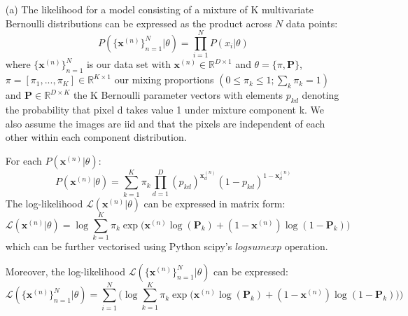 \documentclass[12pt]{article}
\begin{document}
\begin{enumerate}

%
%

\item[(a)] The likelihood for a model consisting of a mixture of K multivariate Bernoulli distributions can be expressed as the product across $N$ data points:
$$P(\{\textbf{x}^{(n)}\}_{n=1}^{N}|\theta) = \prod_{i=1}^{N}P(x_i|\theta)$$
where $\{\textbf{x}^{(n)}\}_{n=1}^{N}$ is our data set with $\textbf{x}^{(n)} \in \mathbb{R}^{D \times 1}$ and $\theta = \{\pi, \mathbf{P}\}$, $\pi = [\pi_1, . . . , \pi_K] \in \mathbb{R}^{K \times 1}$ our mixing proportions $(0 \leq \pi_k \leq 1; \sum_k \pi_k = 1)$ and $\mathbf{P} \in \mathbb{R}^{D \times K}$ the K Bernoulli parameter vectors with elements $p_{kd}$ denoting the probability that pixel d takes value 1 under mixture component k. We also assume the images are iid and that the pixels are independent of each other within each component distribution.

For each $P(\textbf{x}^{(n)}|\theta)$:
$$P(\textbf{x}^{(n)}|\theta) = \sum_{k=1}^{K} \pi_k \prod_{d=1}^D (p_{kd})^{\textbf{x}^{(n)}_{d}} (1-p_{kd})^{1-\textbf{x}^{(n)}_{d}}$$
The log-likelihood $\mathcal{L}(\textbf{x}^{(n)}|\theta)$ can be expressed in matrix form:
$$\mathcal{L}(\textbf{x}^{(n)}|\theta) = \log \sum_{k=1}^{K}  \pi_k \exp\bigg(\textbf{x}^{(n)}\log(\mathbf{P}_{k}) + (1-\textbf{x}^{(n)})\log(1-\mathbf{P}_{k})\bigg) $$
which can be further vectorised using Python scipy's $logsumexp$ operation.

Moreover, the log-likelihood $\mathcal{L}(\{\textbf{x}^{(n)}\}_{n=1}^{N}|\theta)$ can be expressed:
$$\mathcal{L}(\{\textbf{x}^{(n)}\}_{n=1}^{N}|\theta) = \sum_{i=1}^{N} \Bigg( \log \sum_{k=1}^{K}  \pi_k \exp\bigg(\textbf{x}^{(n)}\log(\mathbf{P}_{k}) + (1-\textbf{x}^{(n)})\log(1-\mathbf{P}_{k})\bigg) \Bigg)$$


\end{enumerate}
\end{document}

